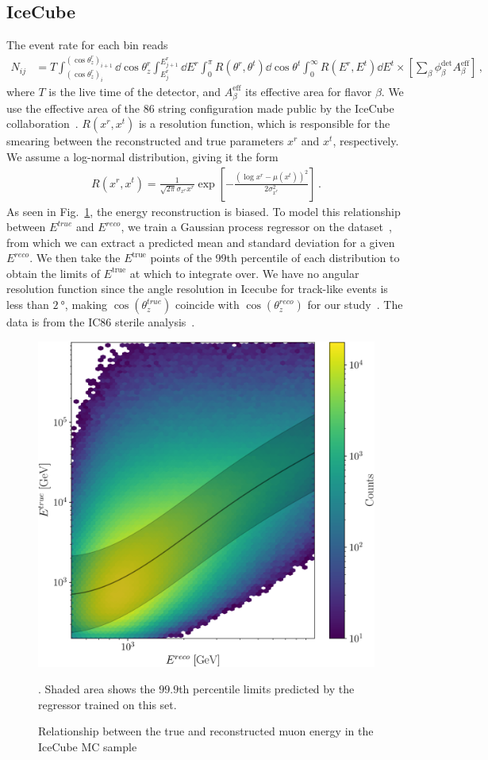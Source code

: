 \documentclass[draft=True]{revtex4-2}
\newcommand{\zreco}{\ensuremath{\cos{(\theta_z^{reco})}}}
\newcommand{\ztrue}{\ensuremath{\cos{(\theta_z^{true})}}}
\begin{document}
\subsection{IceCube}\label{ch:ICmethod}
The event rate for each bin reads
\begin{align}\label{eq:ICevents}
    N_{ij} &= T \int_{(\cos{\theta_z^r})_i}^{(\cos{\theta_z^r})_{i+1}} \dd \cos{\theta^r_z} \int_{E^r_{j}}^{E^r_{j+1}} \dd E^r \int_0^\pi R(\theta^r,\theta^t) \dd \cos{\theta^t} \int_0^\infty R(E^r,E^t) \dd E^t
    \times \left[ \sum_\beta \phi_\beta^\text{det}  A^\text{eff}_\beta\right]\,,
\end{align}
where $T$ is the live time of the detector, and $A^\text{eff}_\beta$ its effective area for flavor $\beta$. We use the effective area of the 86 string configuration made public by the IceCube collaboration~\cite{ICaeff}. $R(x^r,x^t)$ is a resolution function, 
which is responsible for the smearing between the reconstructed and true parameters $x^r$ and $x^t$, respectively. We assume a log-normal distribution, giving it the form 
\begin{align}
    R(x^r, x^t) = \frac{1}{\sqrt{2\pi} \sigma_{x^r}x^r} \exp\left[-\frac{(\log x^r-\mu(x^t))^2}{2\sigma_{x^r}^2}\right]\,.
\end{align}
As seen in Fig.~\ref{fig:IC_MC_counts}, the energy reconstruction is biased. To model this relationship between $E^{true}$ and $E^{reco}$, we train a Gaussian process regressor on the dataset~\cite{IC2016}, from which
we can extract a predicted mean and standard deviation for a given $E^{reco}$. We then take the $E^\text{true}$ points of the 99th percentile of each distribution to obtain
the limits of $E^\text{true}$ at which to integrate over. We have no angular resolution function since the angle resolution in Icecube for track-like events is less than $\SI{2}{\degree}$, making $\ztrue$ coincide with $\zreco$ for our study~\cite{IC2020}. 
The data is from the IC86 sterile analysis~\cite{IC2020}.
\begin{figure}[!tb]
    \begin{center}
       \includegraphics[width=0.4\linewidth]{figures/IC_MC_gpr.pdf} %
    \end{center}
    \caption{Relationship between the true and reconstructed muon energy in the IceCube MC sample~\cite{IC2016}}\label{fig:IC_MC_counts}. Shaded area shows the $99.9$th percentile limits predicted by the regressor trained on this set.
 \end{figure}
\end{document}
